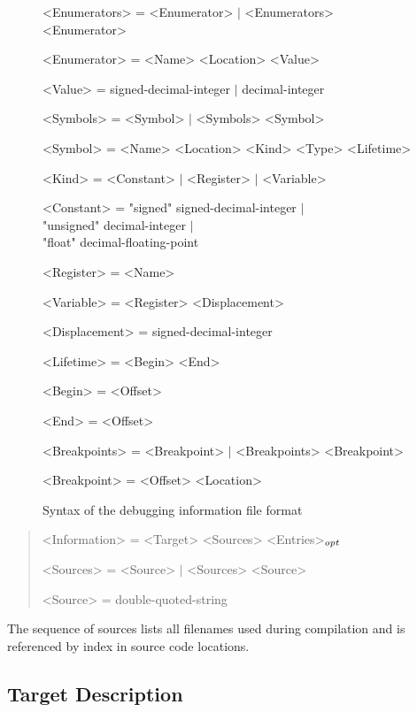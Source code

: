 \begin{figure}
\begin{minipage}{34em}
\begin{grammar}
<Enumerators> = <Enumerator> $\mid$ <Enumerators> <Enumerator> \par
<Enumerator> = <Name> <Location> <Value> \par
<Value> = signed-decimal-integer $\mid$ decimal-integer \par
<Symbols> = <Symbol> $\mid$ <Symbols> <Symbol> \par
<Symbol> = <Name> <Location> <Kind> <Type> <Lifetime> \par
<Kind> = <Constant> $\mid$ <Register> $\mid$ <Variable> \par
<Constant> = "signed" signed-decimal-integer $\mid$ \\ "unsigned" decimal-integer $\mid$ \\ "float" decimal-floating-point \par
<Register> = <Name> \par
<Variable> = <Register> <Displacement> \par
<Displacement> = signed-decimal-integer \par
<Lifetime> = <Begin> <End> \par
<Begin> = <Offset> \par
<End> = <Offset> \par
<Breakpoints> = <Breakpoint> $\mid$ <Breakpoints> <Breakpoint> \par
<Breakpoint> = <Offset> <Location> \par
\end{grammar}\end{minipage}
\caption{Syntax of the debugging information file format}
\label{fig:dbgfileformat}
\end{figure}

\begin{quote}\begin{grammar}
<Information> = <Target> <Sources> <Entries>$_\mathit{opt}$ \par
<Sources> = <Source> $\mid$ <Sources> <Source> \par
<Source> = double-quoted-string \par
\end{grammar}\end{quote}

The sequence of sources lists all filenames used during compilation and is referenced by index in source code locations.

\subsection{Target Description}

